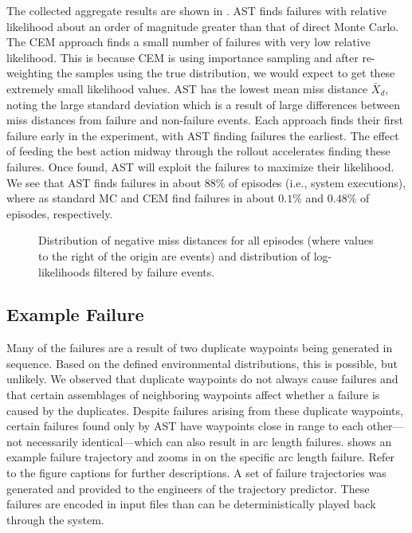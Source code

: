 The collected aggregate results are shown in .
AST finds failures with relative likelihood about an order of magnitude greater than that of direct Monte Carlo.
The CEM approach finds a small number of failures with very low relative likelihood.
This is because CEM is using importance sampling and after re-weighting the samples using the true distribution, we would expect to get these extremely small likelihood values.
AST has the lowest mean miss distance $\bar{X}_d$, noting the large standard deviation which is a result of large differences between miss distances from failure and non-failure events.
Each approach finds their first failure early in the experiment, with AST finding failures the earliest.
The effect of feeding the best action midway through the rollout accelerates finding these failures.
Once found, AST will exploit the failures to maximize their likelihood.
We see that AST finds failures in about $88\%$ of episodes (i.e., system executions), where as standard MC and CEM find failures in about $0.1\%$ and $0.48\%$ of episodes, respectively.


\begin{figure}[t]
\centering
\resizebox{0.6\columnwidth}{!}{}
\caption{Distribution of negative miss distances for all episodes (where values to the right of the origin are events) and distribution of log-likelihoods filtered by failure events.}
\label{fig:distributions}
\end{figure}


\subsection{Example Failure}
Many of the failures are a result of two duplicate waypoints being generated in sequence.
Based on the defined environmental distributions, this is possible, but unlikely.
We observed that duplicate waypoints do not always cause failures and that certain assemblages of neighboring waypoints affect whether a failure is caused by the duplicates.
Despite failures arising from these duplicate waypoints, certain failures found only by AST have waypoints close in range to each other---not necessarily identical---which can also result in arc length failures. 
 shows an example failure trajectory and  zooms in on the specific arc length failure.
Refer to the figure captions for further descriptions.
A set of failure trajectories was generated and provided to the engineers of the trajectory predictor.
These failures are encoded in input files than can be deterministically played back through the system.


